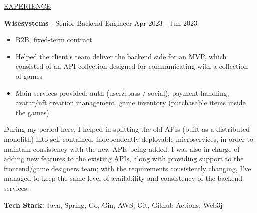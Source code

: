 \documentclass[11pt]{article}
\newcommand{\betteruline}[1]{
    \uline{#1}
}
\newcommand{\sectiontitle}[1]{
    \begingroup
        \titlebold
        \betteruline{\Large\uppercase{#1}  }
        \vspace{1.7mm}
    \endgroup
}
\newcommand{\sectioncontent}[1]{
    \begingroup
        \begin{FlushLeft}
        \vspace{-3mm}
        \sffamily\small#1
        \end{FlushLeft}
    \endgroup
    \vspace{2mm}
}
\newcommand{\job}[3]{
    \begingroup
        \textbf{\small#1} - \small#2
        \hfill\color{black!70}\small{#3}
    \endgroup
}
\newcommand{\spacevv}{
    \vspace{2mm}
}
\newcommand{\honor}[2]{
    \textcolor{black!70}{#1} - #2 \\
    \vspace{1.5mm}
}
\begin{document}
\begin{paracol}{2}



    \switchcolumn
    \sectiontitle{experience}
    \sectioncontent{
      \job{Wisesystems}{Senior Backend Engineer}{Apr 2023 - Jun 2023}
      \begin{itemize}
          \item B2B, fixed-term contract
          \item Helped the client’s team deliver the backend side for an MVP, which consisted of an API collection designed for communicating with a collection of games
          \item Main services provided: auth (user&pass / social), payment handling, avatar/nft creation management, game inventory (purchasable items inside the games)
      \end{itemize}
      \item During my period here, I helped in splitting the old APIs (built as a               distributed monolith) into self-contained, independently deployable                 microservices, in order to maintain consistency with the new APIs being added.
            I was also in charge of adding new features to the existing APIs, along with providing support to the frontend/game designers team; with the requirements consistently changing, I’ve managed to keep the same level of availability and consistency of the backend services.
      \item \textbf{Tech Stack:} Java, Spring, Go, Gin, AWS, Git, Github Actions, Web3j
      \spacevv
      \spacevv
      \spacevv
      
}
\end{paracol}
\end{document}
